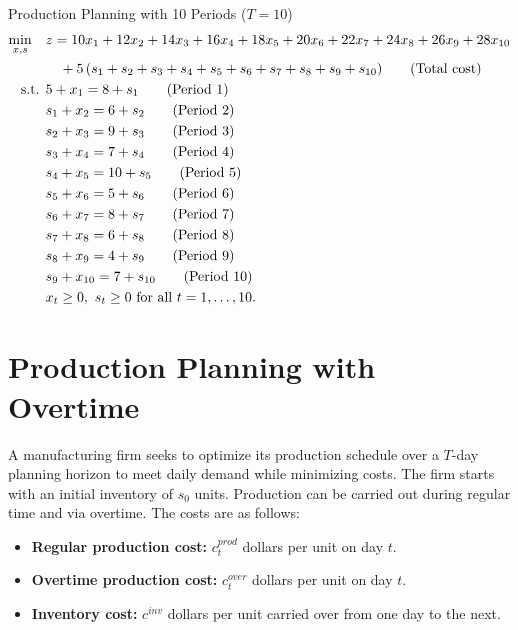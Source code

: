 \begin{examplewithallcode}{Production Planning with 10 Periods (\(T = 10\))}
\begin{align*}
\min_{x,s} \quad & z = 10x_1 + 12x_2 + 14x_3 + 16x_4 + 18x_5 + 20x_6 + 22x_7 + 24x_8 + 26x_9 + 28x_{10} \\
                 & \quad + 5\,(s_1+s_2+s_3+s_4+s_5+s_6+s_7+s_8+s_9+s_{10})   \tag{Total cost} \\
\text{ s.t. }        & 5 + x_1 = 8 + s_1   \tag{Period 1} \\
                 & s_1 + x_2 = 6 + s_2   \tag{Period 2} \\
                 & s_2 + x_3 = 9 + s_3   \tag{Period 3} \\
                 & s_3 + x_4 = 7 + s_4   \tag{Period 4} \\
                 & s_4 + x_5 = 10 + s_5   \tag{Period 5} \\
                 & s_5 + x_6 = 5 + s_6   \tag{Period 6} \\
                 & s_6 + x_7 = 8 + s_7   \tag{Period 7} \\
                 & s_7 + x_8 = 6 + s_8   \tag{Period 8} \\
                 & s_8 + x_9 = 4 + s_9   \tag{Period 9} \\
                 & s_9 + x_{10} = 7 + s_{10}   \tag{Period 10} \\
                 & x_t \geq 0,\ s_t \geq 0 \text{ for all } t=1,\dots,10.
\end{align*}
\end{examplewithallcode}

\section*{Production Planning with Overtime}

A manufacturing firm seeks to optimize its production schedule over a \(T\)-day planning horizon to meet daily demand while minimizing costs. The firm starts with an initial inventory of \(s_0\) units. Production can be carried out during regular time and via overtime. The costs are as follows:
\begin{itemize}
    \item \textbf{Regular production cost:} \(c^{prod}_t\) dollars per unit on day \(t\).
    \item \textbf{Overtime production cost:} \(c^{over}_{t}\) dollars per unit on day \(t\).
    \item \textbf{Inventory cost:} \(c^{inv}\) dollars per unit carried over from one day to the next.
\end{itemize}

